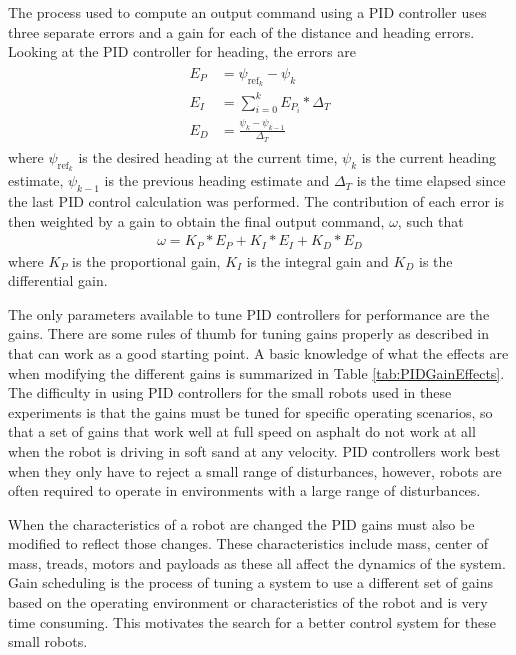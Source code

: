 The process used to compute an output command using a PID controller uses three separate errors and a gain for each of the distance and heading errors. Looking at the PID controller for heading, the errors are
\begin{align*}
\begin{split}
E_P &= \psi_{\text{ref}_k} - \psi_k \\
E_I &= \sum_{i=0}^{k}E_{P_i}*\Delta_T \\
E_D &= \frac{\psi_k - \psi_{k-1}}{\Delta_T}
\end{split}
\end{align*}
where $\psi_{\text{ref}_k}$ is the desired heading at the current time, $\psi_k$ is the current heading estimate, $\psi_{k-1}$ is the previous heading estimate and $\Delta_T$ is the time elapsed since the last PID control calculation was performed. The contribution of each error is then weighted by a gain to obtain the final output command, $\omega$, such that
\begin{align*}
\omega = K_P*E_P + K_I*E_I + K_D*E_D
\end{align*}
where $K_P$ is the proportional gain, $K_I$ is the integral gain and $K_D$ is the differential gain.

The only parameters available to tune PID controllers for performance are the gains. There are some rules of thumb for tuning gains properly as described in \cite{ZeiglerNichols42} that can work as a good starting point. A basic knowledge of what the effects are when modifying the different gains is summarized in Table \ref{tab:PIDGainEffects}. The difficulty in using PID controllers for the small robots used in these experiments is that the gains must be tuned for specific operating scenarios, so that a set of gains that work well at full speed on asphalt do not work at all when the robot is driving in soft sand at any velocity. PID controllers work best when they only have to reject a small range of disturbances, however, robots are often required to operate in environments with a large range of disturbances.

When the characteristics of a robot are changed the PID gains must also be modified to reflect those changes. These characteristics include mass, center of mass, treads, motors and payloads as these all affect the dynamics of the system. Gain scheduling is the process of tuning a system to use a different set of gains based on the operating environment or characteristics of the robot and is very time consuming. This motivates the search for a better control system for these small robots.

